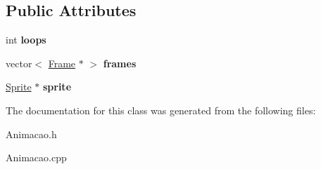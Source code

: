 \subsection*{Public Attributes}
\begin{DoxyCompactItemize}
\item 
\hypertarget{class_edda_1_1_animacao_af9f53cfbff194c5e23aa7a811e575ec2}{
int {\bfseries loops}}
\label{class_edda_1_1_animacao_af9f53cfbff194c5e23aa7a811e575ec2}

\item 
\hypertarget{class_edda_1_1_animacao_afba08a7be39e61375ec196d013809924}{
vector$<$ \hyperlink{class_edda_1_1_frame}{Frame} $\ast$ $>$ {\bfseries frames}}
\label{class_edda_1_1_animacao_afba08a7be39e61375ec196d013809924}

\item 
\hypertarget{class_edda_1_1_animacao_a92d56c89029f189ae78138b8d9c76653}{
\hyperlink{class_edda_1_1_sprite}{Sprite} $\ast$ {\bfseries sprite}}
\label{class_edda_1_1_animacao_a92d56c89029f189ae78138b8d9c76653}

\end{DoxyCompactItemize}


The documentation for this class was generated from the following files:\begin{DoxyCompactItemize}
\item 
Animacao.h\item 
Animacao.cpp\end{DoxyCompactItemize}
